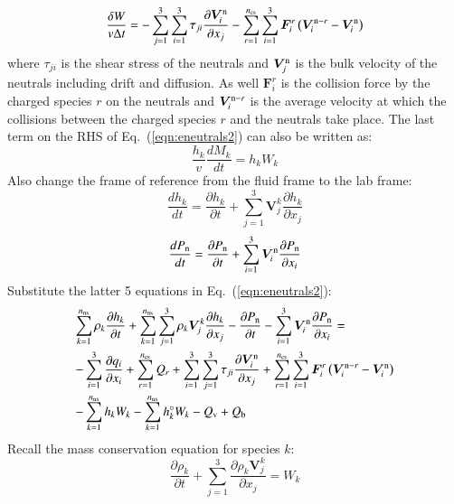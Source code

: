\documentclass{warpdoc}
\newcommand{\alb}{\vspace{0.1cm}\\} %
\newcommand{\mfd}{\displaystyle}
\newcommand{\nns}{{n_{\rm ns}}}
\newcommand{\ncs}{{n_{\rm cs}}}
\renewcommand{\vec}[1]{\bm{#1}}
\begin{document}
%
\begin{equation}
 \frac{\delta W}{v \Delta t}
=
- \sum_{j=1}^3 \sum_{i=1}^3 \tau_{ji} \frac{\partial \vec{V}_i^{\rm n}}{\partial x_j} 
- \sum_{r=1}^\ncs \sum_{i=1}^3 \vec{F}_i^{r} \left( \vec{V}_i^{{\rm n}-r}-\vec{V}_i^{\rm n} \right)
\end{equation}
%
where $\tau_{ji}$ is the shear stress of the neutrals and $\vec{V}_j^{\rm n}$ is the bulk velocity of the neutrals including drift and diffusion. As well $\vec{F}_i^r$ is the collision force by the charged species $r$ on the neutrals and $\vec{V}_i^{{\rm n}-r}$ is the average velocity at which the collisions between the charged species $r$ and the neutrals take place.  The last term on the RHS of Eq.\ (\ref{eqn:eneutrals2}) can also be written as:
%
\begin{equation}
  \frac{h_k}{v}\frac{d M_k}{d t}
=
  h_k W_k
\end{equation}
%
Also change the frame of reference from the fluid frame to the lab frame:
%
\begin{equation}
\frac{d h_k}{d t} = \frac{\partial h_k}{\partial t} + \sum_{j=1}^3 \vec{V}^k_j \frac{\partial h_k}{\partial x_j}
\end{equation}
%
%
\begin{equation}
\frac{d P_{\rm n}}{d t} = \frac{\partial P_{\rm n}}{\partial t} + \sum_{i=1}^3 \vec{V}^{\rm n}_i \frac{\partial P_{\rm n}}{\partial x_i}
\end{equation}
%
Substitute the latter 5 equations in Eq.\ (\ref{eqn:eneutrals2}):
%
\begin{equation}
\begin{array}{l}\mfd
  \sum_{k=1}^\nns \rho_k \frac{\partial h_k}{\partial t} 
+ \sum_{k=1}^\nns \sum_{j=1}^3 \rho_k \vec{V}^k_j \frac{\partial h_k}{\partial x_j} 
- \frac{\partial P_{\rm n}}{\partial t} - \sum_{i=1}^3 \vec{V}^{\rm n}_i \frac{\partial P_{\rm n}}{\partial x_i}
= \alb\mfd
-\sum_{i=1}^{3}\frac{\partial q_i}{\partial x_i}
+\sum_{r=1}^{\ncs} Q_{r}
+\sum_{i=1}^3 \sum_{j=1}^3 \tau_{ji} \frac{\partial \vec{V}_i^{\rm n}}{\partial x_j}
+ \sum_{r=1}^\ncs \sum_{i=1}^3 \vec{F}_i^{r} \left( \vec{V}_i^{{\rm n}-r}-\vec{V}_i^{\rm n} \right) \alb\mfd
- \sum_{k=1}^\nns h_k W_k 
- \sum_{k=1}^\nns h_k^\circ W_k
-  Q_{\rm v}
+ Q_{\rm b}
\end{array}
\label{eqn:eneutrals3}
\end{equation}
%  
Recall the mass conservation equation for species $k$:
%
\begin{equation}
\frac{\partial \rho_k}{\partial t}+ \sum_{j=1}^3 \frac{\partial \rho_k \vec{V}^k_j}{\partial x_j}=W_k 
\end{equation}
\end{document}
